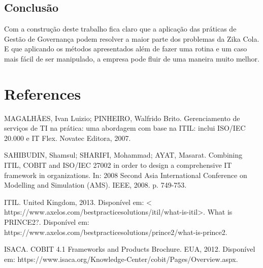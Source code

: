 \documentclass[12pt]{article}
\begin{document}
\subsection{Conclusão}

Com a construção deste trabalho fica claro que a aplicação das práticas de Gestão de Governança podem resolver a maior parte dos problemas da Zika Cola. E que aplicando os métodos apresentados além de fazer uma rotina e um caso mais fácil de ser manipulado, a empresa pode fluir de uma maneira muito melhor.

\section{References}

MAGALHÃES, Ivan Luizio; PINHEIRO, Walfrido Brito. Gerenciamento de
serviços de TI na prática: uma abordagem com base na ITIL: inclui
ISO/IEC 20.000 e IT Flex. Novatec Editora, 2007.

SAHIBUDIN, Shamsul; SHARIFI, Mohammad; AYAT, Masarat. Combining
ITIL, COBIT and ISO/IEC 27002 in order to design a comprehensive IT
framework in organizations. In: 2008 Second Asia International
Conference on Modelling and Simulation (AMS). IEEE, 2008. p. 749-753.

ITIL. United Kingdom, 2013. Disponível em: < https://www.axelos.com/bestpracticesolutions/itil/what-is-itil>. What is PRINCE2?. Disponível em: https://www.axelos.com/bestpracticesolutions/prince2/what-is-prince2.

ISACA. COBIT 4.1 Frameworks and Products Brochure. EUA, 2012. Disponível em:
https://www.isaca.org/Knowledge-Center/cobit/Pages/Overview.aspx. 
\end{document}
